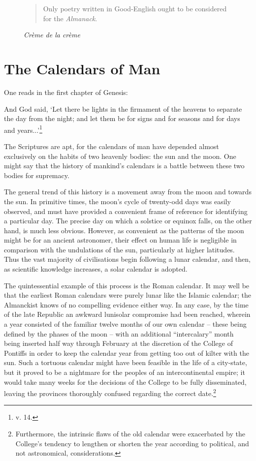 \documentclass[0main.tex]{subfiles}
\begin{document}
\begin{figure}[h]
\caption{\it Cr\`eme de la cr\`eme}
\begin{quote}
Only poetry written in Good-English ought to be considered for the \emph{Almanack}.
\end{quote}
\end{figure}

\section{The Calendars of Man}

One reads in the first chapter of Genesis:

\bigskip

{\footnotesize And God said, `Let there be lights in the firmament of the heavens to separate the day from the night; and let them be for signs and for seasons and for days and years...'\footnote{v. 14.}}

\bigskip

The Scriptures are apt, for the calendars of man have depended almost exclusively on the habits of two heavenly bodies: the sun and the moon. One might say that the history of mankind's calendars is a battle between these two bodies for supremacy.

The general trend of this history is a movement away from the moon and towards the sun. In primitive times, the moon's cycle of twenty-odd days was easily observed, and must have provided a convenient frame of reference for identifying a particular day. The precise day on which a solstice or equinox falls, on the other hand, is much less obvious. However, as convenient as the patterns of the moon might be for an ancient astronomer, their effect on human life is negligible in comparison with the undulations of the sun, particularly at higher latitudes. Thus the vast majority of civilisations begin following a lunar calendar, and then, as scientific knowledge increases, a solar calendar is adopted.

The quintessential example of this process is the Roman calendar. It may well be that the earliest Roman calendars were purely lunar like the Islamic calendar; the Almanckist knows of no compelling evidence either way. In any case, by the time of the late Republic an awkward lunisolar compromise had been reached, wherein a year consisted of the familiar twelve months of our own calendar -- these being defined by the phases of the moon -- with an additional ``intercalary'' month being inserted half way through February at the discretion of the College of Pontiffs in order to keep the calendar year from getting too out of kilter with the sun. Such a tortuous calendar might have been feasible in the life of a city-state, but it proved to be a nightmare for the peoples of an intercontinental empire; it would take many weeks for the decisions of the College to be fully disseminated, leaving the provinces thoroughly confused regarding the correct date.\footnote{Furthermore, the intrinsic flaws of the old calendar were exacerbated by the College's tendency to lengthen or shorten the year according to political, and not astronomical, considerations.}
\end{document}

